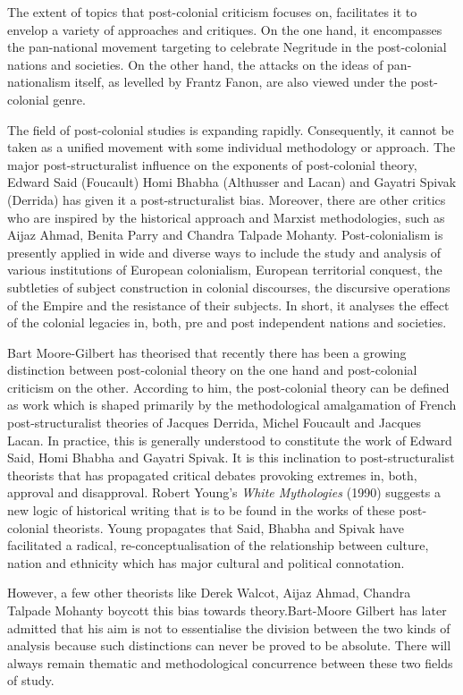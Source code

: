 The extent of topics that post-colonial criticism focuses on, facilitates it to envelop a variety of approaches and critiques. On the one hand, it encompasses the pan-national movement targeting to celebrate Negritude in the post-colonial nations and societies. On the other hand, the attacks on the ideas of pan-nationalism itself, as levelled by Frantz Fanon, are also viewed under the post-colonial genre.

The field of post-colonial studies is expanding rapidly. Consequently, it cannot be taken as a unified movement with some individual methodology or approach. The major post-structuralist influence on the exponents of post-colonial theory, Edward Said (Foucault) Homi Bhabha (Althusser and Lacan) and Gayatri Spivak (Derrida) has given it a post-structuralist bias. Moreover, there are other critics who are inspired by the historical approach and Marxist methodologies, such as Aijaz Ahmad, Benita Parry and Chandra Talpade Mohanty. Post-colonialism is presently applied in wide and diverse ways to include the study and analysis of various institutions of European colonialism, European territorial conquest, the subtleties of subject construction in colonial discourses, the discursive operations of the Empire and the resistance of their subjects. In short, it analyses the effect of the colonial legacies in, both, pre and post independent nations and societies.

Bart Moore-Gilbert has theorised that recently there has been a growing distinction between post-colonial theory on the one hand and post-colonial criticism on the other. According to him, the post-colonial theory can be defined as work which is shaped primarily by the methodological amalgamation of French post-structuralist theories of Jacques Derrida, Michel Foucault and Jacques Lacan. In practice, this is generally understood to constitute the work of Edward Said, Homi Bhabha and Gayatri Spivak. It is this inclination to post-structuralist theorists that has propagated critical debates provoking extremes in, both, approval and disapproval. Robert Young’s \emph{White Mythologies} (1990) suggests a new logic of historical writing that is to be found in the works of these post-colonial theorists. Young propagates that Said, Bhabha and Spivak have facilitated a radical, re-conceptualisation of the relationship between culture, nation and ethnicity which has major cultural and political connotation. 

However, a few other theorists like Derek Walcot, Aijaz Ahmad, Chandra Talpade Mohanty boycott this bias towards theory.\linebreak Bart-Moore Gilbert has later admitted that his aim is not to essentialise the division between the two kinds of analysis because such distinctions can never be proved to be absolute. There will always remain thematic and methodological concurrence between these two fields of study. 

